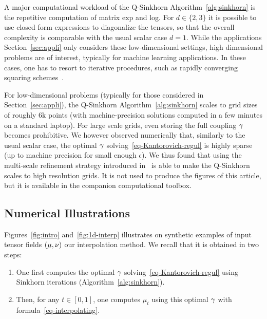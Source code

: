 

\begin{rem}
A major computational workload of the Q-Sinkhorn Algorithm~\ref{alg:sinkhorn} is the repetitive computation of matrix exp and log. 
%
For $d \in \{2,3\}$ it is possible to use closed form expressions to diagonalize the tensors, so that the overall complexity is comparable with the usual scalar case $d=1$.
%
While the applications Section~\ref{sec:appli} only considers these low-dimensional settings, high dimensional problems are of interest, typically for machine learning applications.  In these cases, one has to resort to iterative procedures, such as rapidly converging squaring schemes~\cite{HighamExp,HighamLog}.
\end{rem}

\begin{rem}
For low-dimensional problems (typically for those considered in Section~\ref{sec:appli}), the Q-Sinkhorn Algorithm~\ref{alg:sinkhorn} scales to grid sizes of roughly 6k points (with machine-precision solutions computed in a few minutes on a standard laptop).
%
For large scale grids, even storing the full coupling $\gamma$ becomes prohibitive. We however observed numerically that, similarly  to the usual scalar case, the optimal $\gamma$ solving~\eqref{eq-Kantorovich-regul} is highly sparse (up to machine precision for small enough $\epsilon$).
% 
We thus found that using the multi-scale refinement strategy introduced in~\cite{Schmitzer2016} is able to make the Q-Sinkhorn scales to high resolution grids.  It is not used to produce the figures of this article, but it is available in the companion computational toolbox.
\end{rem}

\subsection{Numerical Illustrations}
\label{sec-numerics-interp}

Figures~\ref{fig:intro} and~\ref{fig:1d-interp} illustrates on synthetic examples of input tensor fields $(\mu,\nu)$ our interpolation method. 
%
We recall that it is obtained in two steps:
\begin{enumerate}
	\item One first computes the optimal $\gamma$ solving~\eqref{eq-Kantorovich-regul} using Sinkhorn iterations (Algorithm~\ref{alg:sinkhorn}).
	\item Then, for any $t \in [0,1]$, one computes $\mu_t$ using this optimal $\gamma$ with formula~\eqref{eq-interpolating}.
\end{enumerate}
   
